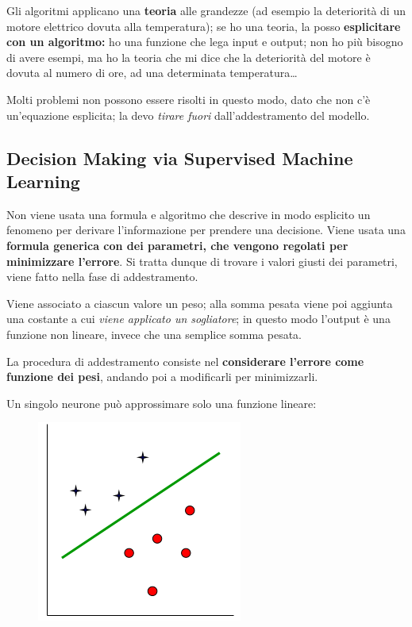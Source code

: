 \documentclass{report}
\begin{document}
\noindent Gli algoritmi applicano una \textbf{teoria} alle grandezze (ad esempio la deteriorità di un motore elettrico dovuta alla temperatura); se ho una 
teoria, la posso \textbf{esplicitare con un algoritmo:} ho una funzione che lega input e output; non ho più bisogno di avere esempi, ma ho la teoria 
che mi dice che la deteriorità del motore è dovuta al numero di ore, ad una determinata temperatura\dots

\noindent Molti problemi non possono essere risolti in questo modo, dato che non c'è un'equazione esplicita; la devo \textit{tirare fuori} dall'addestramento 
del modello.


\subsection{Decision Making via Supervised Machine Learning}
Non viene usata una formula e algoritmo che descrive in modo esplicito un fenomeno per derivare l'informazione per prendere una decisione. Viene 
usata una \textbf{formula generica con dei parametri, che vengono regolati per minimizzare l'errore}. Si tratta dunque di trovare i valori 
giusti dei parametri, viene fatto nella fase di addestramento.

\noindent Viene associato a ciascun valore un peso; alla somma pesata viene poi aggiunta una costante a cui \textit{viene applicato un 
sogliatore}; in questo modo l'output è una funzione non lineare, invece che una semplice somma pesata.

\noindent La procedura di addestramento consiste nel \textbf{considerare l'errore come funzione dei pesi}, andando poi a modificarli per 
minimizzarli.

\noindent Un singolo neurone può approssimare solo una funzione lineare:

\begin{figure}[H]
    \centering
    \includegraphics[width=0.4\linewidth]{images/linear.png}
\end{figure}
\end{document}
